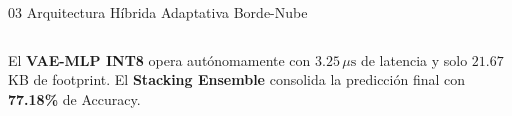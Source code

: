 \documentclass[aspectratio=169, 10pt]{beamer}
\begin{document}
\begin{frame}{03 \quad Arquitectura Híbrida Adaptativa Borde-Nube}
\begin{center}
{}
  \end{center}

  \vspace{0.15cm}
  \begin{columns}
    \small
    \textcolor{textmuted}{El \textcolor{cyanneon}{\textbf{VAE-MLP INT8}} opera autónomamente
    con $3.25\,\mu\text{s}$ de latencia y solo $21.67$ KB de footprint.}
    \small
    \textcolor{textmuted}{El \textcolor{goldacc}{\textbf{Stacking Ensemble}} consolida
    la predicción final con \textbf{77.18\%} de Accuracy.}
  \end{columns}
\end{frame}
\end{document}
